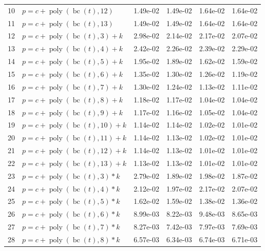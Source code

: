 \documentclass[12pt,a4paper]{article}
\DeclareMathOperator{\bc}{bc}
\DeclareMathOperator{\poly}{poly}
\begin{document}
\begin{longtable}[t]{ll>{\raggedleft\arraybackslash}p{2cm}>{\raggedleft\arraybackslash}p{2cm}>{\raggedleft\arraybackslash}p{2cm}>{\raggedleft\arraybackslash}p{2cm}}
10 & $p = c + \poly\left( \bc(t), 12 \right)$ & 1.49e-02 & 1.49e-02 & 1.64e-02 & 1.64e-02\\
\rowcolor{gray!6}  11 & $p = c + \poly\left( \bc(t), 13 \right)$ & 1.49e-02 & 1.49e-02 & 1.64e-02 & 1.64e-02\\
12 & $p = c + \poly\left( \bc(t), 3 \right) + k$ & 2.98e-02 & 2.14e-02 & 2.17e-02 & 2.07e-02\\
\rowcolor{gray!6}  13 & $p = c + \poly\left( \bc(t), 4 \right) + k$ & 2.42e-02 & 2.26e-02 & 2.39e-02 & 2.29e-02\\
14 & $p = c + \poly\left( \bc(t), 5 \right) + k$ & 1.95e-02 & 1.89e-02 & 1.62e-02 & 1.59e-02\\
\rowcolor{gray!6}  15 & $p = c + \poly\left( \bc(t), 6 \right) + k$ & 1.35e-02 & 1.30e-02 & 1.26e-02 & 1.19e-02\\
16 & $p = c + \poly\left( \bc(t), 7 \right) + k$ & 1.30e-02 & 1.24e-02 & 1.13e-02 & 1.11e-02\\
\rowcolor{gray!6}  17 & $p = c + \poly\left( \bc(t), 8 \right) + k$ & 1.18e-02 & 1.17e-02 & 1.04e-02 & 1.04e-02\\
18 & $p = c + \poly\left( \bc(t), 9 \right) + k$ & 1.17e-02 & 1.16e-02 & 1.05e-02 & 1.04e-02\\
\rowcolor{gray!6}  19 & $p = c + \poly\left( \bc(t), 10 \right) + k$ & 1.14e-02 & 1.14e-02 & 1.02e-02 & 1.01e-02\\
20 & $p = c + \poly\left( \bc(t), 11 \right) + k$ & 1.14e-02 & 1.13e-02 & 1.02e-02 & 1.01e-02\\
\rowcolor{gray!6}  21 & $p = c + \poly\left( \bc(t), 12 \right) + k$ & 1.14e-02 & 1.13e-02 & 1.01e-02 & 1.01e-02\\
22 & $p = c + \poly\left( \bc(t), 13 \right) + k$ & 1.13e-02 & 1.13e-02 & 1.01e-02 & 1.01e-02\\
\rowcolor{gray!6}  23 & $p = c + \poly\left( \bc(t), 3 \right) * k$ & 2.79e-02 & 1.89e-02 & 1.98e-02 & 1.87e-02\\
24 & $p = c + \poly\left( \bc(t), 4 \right) * k$ & 2.12e-02 & 1.97e-02 & 2.17e-02 & 2.07e-02\\
\rowcolor{gray!6}  25 & $p = c + \poly\left( \bc(t), 5 \right) * k$ & 1.62e-02 & 1.59e-02 & 1.38e-02 & 1.36e-02\\
26 & $p = c + \poly\left( \bc(t), 6 \right) * k$ & 8.99e-03 & 8.22e-03 & 9.48e-03 & 8.65e-03\\
\rowcolor{gray!6}  27 & $p = c + \poly\left( \bc(t), 7 \right) * k$ & 8.27e-03 & 7.42e-03 & 7.97e-03 & 7.69e-03\\
28 & $p = c + \poly\left( \bc(t), 8 \right) * k$ & 6.57e-03 & 6.34e-03 & 6.74e-03 & 6.71e-03\\

\end{longtable}
\end{document}
